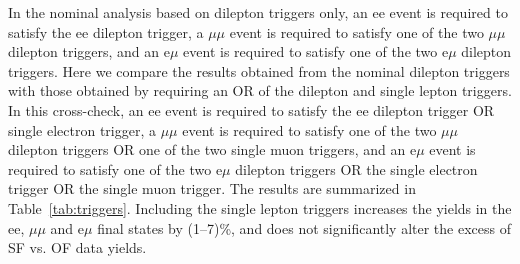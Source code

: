 In the nominal analysis based on dilepton triggers only, an ee event is required to satisfy the ee dilepton trigger, a $\mu\mu$ event is required to
satisfy one of the two $\mu\mu$ dilepton triggers, and an e$\mu$ event is required to satisfy one of the two e$\mu$ dilepton triggers. Here we compare
the results obtained from the nominal dilepton triggers with those obtained by requiring an OR of the dilepton and single lepton triggers. In this cross-check,
an ee event is required to satisfy the ee dilepton trigger OR single electron trigger, a $\mu\mu$ event is required to
satisfy one of the two $\mu\mu$ dilepton triggers OR one of the two single muon triggers, and an e$\mu$ event is required to satisfy one of the two e$\mu$ dilepton triggers
OR the single electron trigger OR the single muon trigger. The results are summarized in Table~\ref{tab:triggers}. Including the single lepton triggers increases
the yields in the ee, $\mu\mu$ and e$\mu$ final states by (1--7)\%, and does not significantly alter the excess of SF vs. OF data yields.

